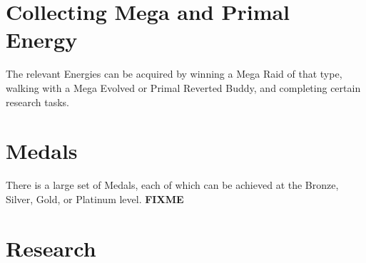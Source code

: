 \section{Collecting Mega and Primal Energy}
The relevant Energies can be acquired by winning a Mega Raid of that type,
  walking with a Mega Evolved or Primal Reverted Buddy, and completing
  certain research tasks.

\section{Medals}
There is a large set of Medals, each of which can be achieved at the Bronze,
 Silver, Gold, or Platinum level.
\textbf{FIXME}

\section{Research}
\label{sec:research}

